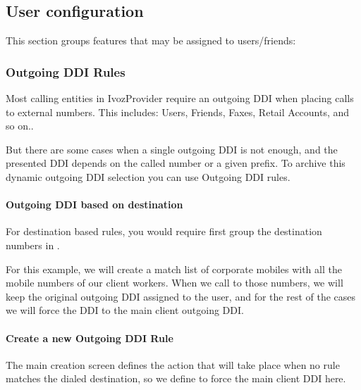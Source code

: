 \documentclass[letterpaper,10pt,spanish]{sphinxmanual}
\begin{document}
\subsection{User configuration}
\label{administration_portal/client/vpbx/user_configuration/index:user-configuration}\label{administration_portal/client/vpbx/user_configuration/index::doc}
This section groups features that may be assigned to users/friends:


\subsubsection{Outgoing DDI Rules}
\label{administration_portal/client/vpbx/user_configuration/outgoing_ddi_rules:outgoing-ddi-rules}\label{administration_portal/client/vpbx/user_configuration/outgoing_ddi_rules:outgoingddi-rules}\label{administration_portal/client/vpbx/user_configuration/outgoing_ddi_rules::doc}
Most calling entities in IvozProvider require an outgoing DDI when placing calls
to external numbers. This includes: Users, Friends, Faxes, Retail Accounts, and
so on..

But there are some cases when a single outgoing DDI is not enough, and the
presented DDI depends on the called number or a given prefix. To archive this
dynamic outgoing DDI selection you can use Outgoing DDI rules.


\paragraph{Outgoing DDI based on destination}
\label{administration_portal/client/vpbx/user_configuration/outgoing_ddi_rules:outgoing-ddi-based-on-destination}
For destination based rules, you would require first group the destination
numbers in {\hyperref[administration_portal/client/vpbx/routing_tools/match_lists:match\string-lists]{}}.

For this example, we will create a match list of corporate mobiles with all
the mobile numbers of our client workers. When we call to those numbers, we
will keep the original outgoing DDI assigned to the user, and for the rest of
the cases we will force the DDI to the main client outgoing DDI.
\paragraph{Create a new Outgoing DDI Rule}

The main creation screen defines the action that will take place when no rule
matches the dialed destination, so we define to force the main client DDI here.
\end{document}
